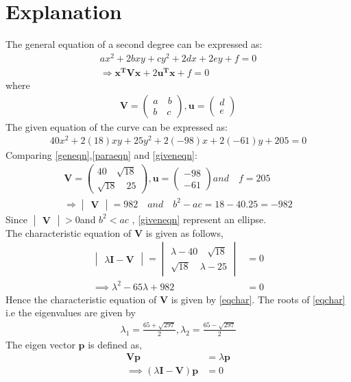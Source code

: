 \documentclass[journal,12pt,twocolumn]{IEEEtran}
\providecommand{\brak}[1]{\ensuremath{\left(#1\right)}}
\newcommand{\myvec}[1]{\ensuremath{\begin{pmatrix}#1\end{pmatrix}}}
\newcommand{\mydet}[1]{\ensuremath{\begin{vmatrix}#1\end{vmatrix}}}
\numberwithin{equation}{subsection}
\let\vec\mathbf
\begin{document}
\section{Explanation}
The general equation of a second degree can
be expressed as:
\begin{align}
a{x^2}+2b{xy}+c{y^2}+2d{x}+2e{y}+f=0\label{geneqn}\\
   \Longrightarrow \vec{x^TVx}+2\vec{u^Tx}+f=0\label{geneqn2}
\end{align}
where\begin{align}
\vec{V} =\myvec{a\quad b\\b\quad c},\vec{u}=\myvec{d\\e}\label{paraeqn} 
\end{align}
The given equation of the curve can be expressed as:
\begin{align}
    40{x^2}+2(18){xy}+25{y^2}+2(-98){x}+2(-61){y}+205=0\label{giveneqn}
\end{align}
Comparing \eqref{geneqn},\eqref{paraeqn} and \eqref{giveneqn}:\\
\begin{align}
\vec{V} = \myvec{40\quad\sqrt{18}\\\sqrt{18}\quad 25},\vec{u}=\myvec{-98\\-61} and\quad f=205 \\
       \Longrightarrow\mydet{\vec{V}}=982\quad and \quad b^2-ac=18-40.25 =-982
\end{align}
Since $\mydet{\vec{V}}>0$\quad and \quad $b^2<ac$ , \eqref{giveneqn} represent an ellipse. \\
 The characteristic equation of $\vec{V}$ is given as follows,
\begin{align}
\mydet{\lambda\vec{I}-\vec{V}} = \mydet{\lambda-40\quad\sqrt{18}\\\sqrt{18}\quad\lambda -25} &= 0\\
\implies \lambda^2-65\lambda+982 &= 0\label{eqchar}
\end{align}
Hence the characteristic equation of $\vec{V}$ is given by \eqref{eqchar}. The roots of \eqref{eqchar} i.e the eigenvalues are given by
\begin{align}
\lambda_1=\frac{65+\sqrt{297}}{2}, \lambda_2=\frac{65-\sqrt{297}}{2}\label{eqeigenvals}    
\end{align}
The eigen vector $\vec{p}$ is defined as, 
\begin{align}
\vec{V}\vec{p} &= \lambda\vec{p}\\
\implies\brak{\lambda\vec{I}-\vec{V}}\vec{p}&=0\label{eqneigvenvec}
\end{align}
\end{document}
